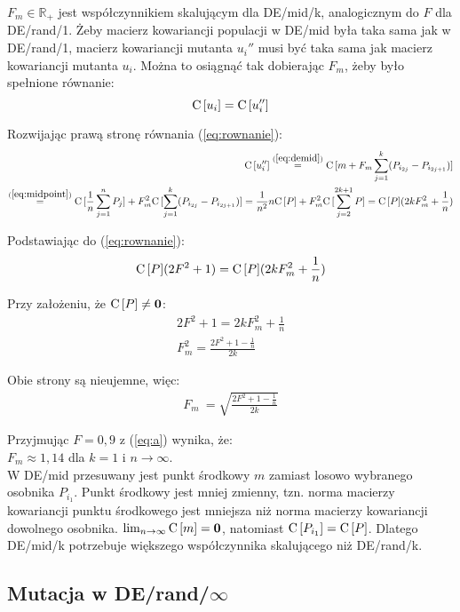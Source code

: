 $F_m\in\mathbb{R_+}$ jest współczynnikiem skalującym dla DE/mid/k, analogicznym do $F$ dla DE/rand/1. 
Żeby macierz kowariancji populacji w DE/mid była taka sama jak w DE/rand/1, 
macierz kowariancji mutanta $u_i''$ musi być taka sama jak macierz kowariancji mutanta $u_i$.
Można to osiągnąć tak dobierając $F_m$, żeby było spełnione równanie:
\begin{equation} \label{eq:rownanie}
{\rm C}\,[u_i] = {\rm C}\,[u_i'']
\end{equation}

Rozwijając prawą stronę równania (\ref{eq:rownanie}):
\begin{align*}
{\rm C}\,[u_i''] \overset{(\ref{eq:demid})}{=} {\rm C}\,[m + F_m\sum\limits_{j=1}^k (P_{i_{2j}} - P_{i_{2j+1}})] \\
\overset{(\ref{eq:midpoint})}{=} {\rm C}\,[\frac{1}{n}\sum\limits_{j=1}^n P_j] + F_m^2{\rm C}\,[\sum\limits_{j=1}^k (P_{i_{2j}} - P_{i_{2j+1}})] 
= \frac{1}{n^2}n{\rm C}\,[P] + F_m^2{\rm C}\,[\sum\limits_{j=2}^{2k+1} P] = {\rm C}\,[P](2kF_m^2 + \frac{1}{n})
\end{align*}

Podstawiając do (\ref{eq:rownanie}):
\begin{align*}
{\rm C}\,[P](2F^2 + 1) = {\rm C}\,[P](2kF_m^2 + \frac{1}{n})
\end{align*}

Przy założeniu, że ${\rm C}\,[P] \neq \textbf{0}$:
\begin{align*}
2F^2 + 1 = 2kF_m^2 + \frac{1}{n} \\
F_m^2 = \frac{2F^2 + 1 - \frac{1}{n}}{2k}
\end{align*}

Obie strony są nieujemne, więc:
\begin{align} \label{eq:a}
F_m\ = \sqrt{\frac{2F^2 + 1 - \frac{1}{n}}{2k}}
\end{align}

Przyjmując $F=0,9$ z (\ref{eq:a}) wynika, że: \\
$F_m \approx 1,14$ dla $k=1$ i $n\to\infty$. \\

W DE/mid przesuwany jest punkt środkowy $m$ zamiast losowo wybranego osobnika $P_{i_1}$.
Punkt środkowy jest mniej zmienny, 
tzn. norma macierzy kowariancji punktu środkowego jest mniejsza niż norma macierzy kowariancji dowolnego osobnika.
$\lim_{n\to\infty} {\rm C}\,[m] = \textbf{0}$, natomiast ${\rm C}\,[P_{i_1}] = {\rm C}\,[P]$.
Dlatego DE/mid/k potrzebuje większego współczynnika skalującego niż DE/rand/k. \\

\subsection{Mutacja w DE/rand/$\infty$}


